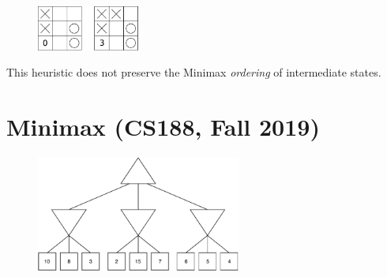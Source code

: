 \documentclass[11pt, a4paper]{article}
\begin{document}
\begin{enumerate}
\begin{solution}
        \begin{figure}[h]
            \centering
            \includegraphics[width=0.3\textwidth]{figures/e2_misleading.pdf}
        \end{figure}

        This heuristic does not preserve the Minimax \emph{ordering} of intermediate states.
    \end{solution}

\end{enumerate}

\newpage

\section{Minimax (CS188, Fall 2019)}

\begin{figure}[h]
    \centering
    \includegraphics[width=0.6\textwidth]{figures/e2_minimax_0.pdf}
\end{figure}
\end{document}
